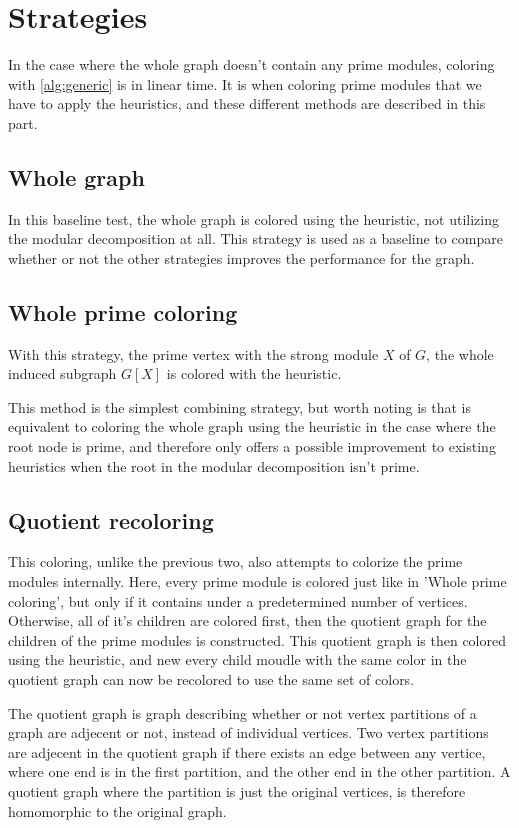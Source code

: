 \documentclass{amsart}
\begin{document}
\section{Strategies}
\label{sec:Strategies}
In the case where the whole graph doesn't contain any prime modules, coloring
with \autoref{alg:generic} is in linear time. It is when coloring prime modules
that we have to apply the heuristics, and these different methods are
described in this part.

\subsection{Whole graph}

In this baseline test, the whole graph is colored using the heuristic, not
utilizing the modular decomposition at all. This strategy is used as a baseline
to compare whether or not the other strategies improves the performance for the
graph.

\subsection{Whole prime coloring}

With this strategy, the prime vertex with the strong module $X$ of $G$, the
whole induced subgraph $G[X]$ is colored with the heuristic.

This method is the simplest combining strategy, but worth noting is that is
equivalent to coloring the whole graph using the heuristic in the case where the
root node is prime, and therefore only offers a possible improvement to existing
heuristics when the root in the modular decomposition isn't prime.

\subsection{Quotient recoloring}

This coloring, unlike the previous two, also attempts to colorize the prime
modules internally. Here, every prime module is colored just like in 'Whole
prime coloring', but only if it contains under a predetermined number of
vertices. Otherwise, all of it's children are colored first, then the quotient
graph for the children of the prime modules is constructed. This quotient graph
is then colored using the heuristic, and new every child moudle with the same
color in the quotient graph can now be recolored to use the same set of colors.

The quotient graph is graph describing whether or not vertex partitions of a
graph are adjecent or not, instead of individual vertices. Two vertex
partitions are adjecent in the quotient graph if there exists an edge between
any vertice, where one end is in the first partition, and the other end in the
other partition. A quotient graph where the partition is just the original
vertices, is therefore homomorphic to the original graph.
\end{document}
